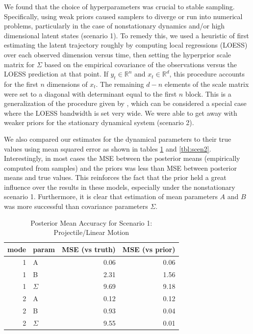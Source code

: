 \documentclass{article} %
\begin{document}
We found that the choice of hyperparameters was crucial to stable sampling. Specifically, using weak priors caused samplers to diverge or run into numerical problems, particularly in the case of nonstationary dynamics and/or high dimensional latent states (scenario 1). To remedy this, we used a heuristic of first estimating the latent trajectory roughly by computing local regressions (LOESS) over each observed dimension versus time, then setting the hyperprior scale matrix for $\Sigma$ based on the empirical covariance of the observations versus the LOESS prediction at that point. If $y_t\in\mathbb{R}^n$ and $x_t\in\mathbb{R}^d$, this procedure accounts for the first $n$ dimensions of $x_t$. The remaining $d-n$ elements of the scale matrix were set to a diagonal with determinant equal to the first $n$ block. This is a generalization of the procedure given by \cite{fox_bayesian_2009}, which can be considered a special case where the LOESS bandwidth is set very wide. We were able to get away with weaker priors for the stationary dynamical system (scenario 2).

We also compared our estimates for the dynamical parameters to their true values using mean squared error as shown in tables \ref{tbl:scen1} and \ref{tbl:scen2}. Interestingly, in most cases the MSE between the posterior means (empirically computed from samples) and the priors was less than MSE between posterior means and true values. This reinforces the fact that the prior held a great influence over the results in these models, especially under the nonstationary scenario 1. Furthermore, it is clear that estimation of mean parameters $A$ and $B$ was more successful than covariance parameters $\Sigma$.

\begin{table}[]
\centering
\caption{Posterior Mean Accuracy for Scenario 1: Projectile/Linear Motion}
\label{tbl:scen1}
\begin{tabular}{rlrr}
\hline
mode & param & MSE (vs truth) & MSE (vs prior)\\ \hline
1 & A     & 0.06      & 0.06       \\
1 & B     & 2.31      & 1.56       \\
1 & $\Sigma$ & 9.69      & 9.18       \\
2 & A     & 0.12      & 0.12       \\
2 & B     & 0.93      & 0.04       \\
2 & $\Sigma$ & 9.55      & 0.01       \\ \hline
\end{tabular}
\end{table}
\end{document}
